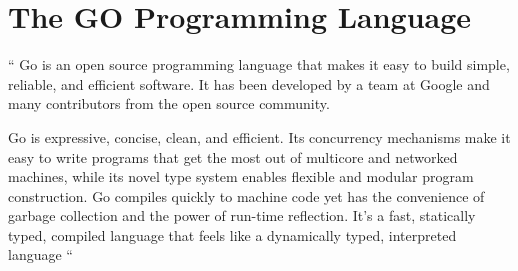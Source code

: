 \section{The GO Programming Language}

`` Go is an open source programming language that makes it easy to
build simple, reliable, and efficient software. It has been developed
by a team at Google and many contributors from the open source 
community.

Go is expressive, concise, clean, and efficient. Its concurrency
mechanisms make it easy to write programs that get the most out of
multicore and networked machines, while its novel type system enables
flexible and modular program construction. Go compiles quickly to
machine code yet has the convenience of garbage collection and the
power of run-time reflection. It's a fast, statically typed, compiled
language that feels like a dynamically typed, interpreted
language ``\cite{hid-sp18-522-golanguage}


